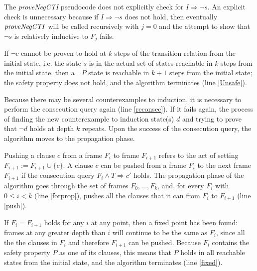 \documentclass[12pt,a4paper,twoside,openright]{report}
\begin{document}
{The {\it proveNegCTI} pseudocode does not explicitly check for $I \Rightarrow
\neg s$. An explicit check is unnecessary because if
$I \Rightarrow \neg s$ does not hold, then eventually ${\it proveNegCTI}$
will be called recursively with $j = 0$ and the attempt to show that
$\neg s$ is relatively inductive to $F_j$ fails.

\begin{algorithm}[H]
\DontPrintSemicolon
{}
\end{algorithm}

If $\neg c$ cannot be proven to hold at $k$ steps of
the transition relation from the initial state, i.e. the state $s$ is in the actual
set of states reachable in $k$ steps from the initial state, then a $\neg P$ state
is reachable in $k + 1$ steps from the initial state; the safety property does not
hold, and the algorithm terminates (line \ref{Unsafe}).

Because there may be several counterexamples to induction, it is necessary to
perform the consecution query again (line \ref{reconsec}). If it fails again,
the process of finding the new counterexample to induction state(s) $d$ and trying to
prove that $\neg d$ holds at depth $k$ repeats. Upon the success of the consecution
query, the algorithm moves to the propagation phase.

Pushing a clause $c$ from a frame $F_i$ to frame $F_{i + 1}$ refers to the act
of setting $F_{i + 1} := F_{i + 1} \cup \{ c \}$.
A clause $c$ can be pushed from a frame $F_i$ to the next frame $F_{i + 1}$
if the consecution query $F_i \wedge T \Rightarrow c'$ holds.
The propagation phase of the algorithm goes through the set of frames
$F_0, \ldots, F_k$, and, for every $F_i$ with $0 \leq i < k$ (line \ref{forprop}),
pushes all the clauses that it can from $F_i$ to $F_{i + 1}$ (line \ref{push}).

If $F_i = F_{i + 1}$ holds for any $i$ at any point, then a fixed point has
been found: frames at any greater depth than $i$ will continue to be the
same as $F_i$, since all the the clauses in $F_i$ and therefore $F_{i + 1}$
can be pushed.
Because $F_i$ contains the safety property $P$ as one of its clauses,
this means that $P$ holds in all reachable states from the initial state,
and the algorithm terminates (line \ref{fixed}).

}
\end{document}
